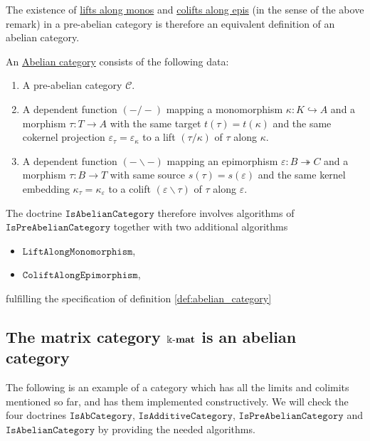 The existence of \ul{lifts along monos} and \ul{colifts along epis} (in the sense of the above remark)
in a pre-abelian category is therefore an equivalent definition of an abelian category.

\begin{definition}\label{def:abelian_category}
An \ul{Abelian category} consists of the following data:
\begin{enumerate}
\renewcommand{\labelenumi}{(\theenumi)}
\item A pre-abelian category $\mathcal{C}$.
\item A dependent function $( - / - )$ mapping a monomorphism $\kappa : K \hookrightarrow A$ and a morphism $\tau : T \rightarrow A$ with
the same target $t(\tau) = t(\kappa)$ and the same cokernel projection $\varepsilon_{\tau} = \varepsilon_{\kappa}$ to a lift $(\tau / \kappa)$ of
$\tau$ along $\kappa$.
\item A dependent function $( - \backslash - )$ mapping an epimorphism $\varepsilon : B \twoheadrightarrow C$ and a morphism
$\tau : B \rightarrow T$ with same source $s(\tau) = s(\varepsilon)$ and the same kernel embedding $\kappa_{\tau} = \kappa_{\varepsilon}$
to a colift $(\varepsilon \backslash \tau)$ of $\tau$ along $\varepsilon$.
\end{enumerate}
\end{definition}

\begin{doctrine}
The doctrine $\mathtt{IsAbelianCategory}$ therefore involves algorithms of $\mathtt{IsPreAbelianCategory}$ together
with two additional algorithms
\begin{itemize}
\item $\mathtt{LiftAlongMonomorphism}$,
\item $\mathtt{ColiftAlongEpimorphism}$,
\end{itemize}
fulfilling the specification of definition \ref{def:abelian_category}
\end{doctrine}

\subsection{The matrix category $\Bbbk\textnormal{-}\mathbf{mat}$ is an abelian category}

The following is an example of a category which has all the limits and colimits mentioned so far, and has them implemented constructively.
We will check the four doctrines $\mathtt{IsAbCategory}$, $\mathtt{IsAdditiveCategory}$, $\mathtt{IsPreAbelianCategory}$ and
$\mathtt{IsAbelianCategory}$ by providing the needed algorithms.

